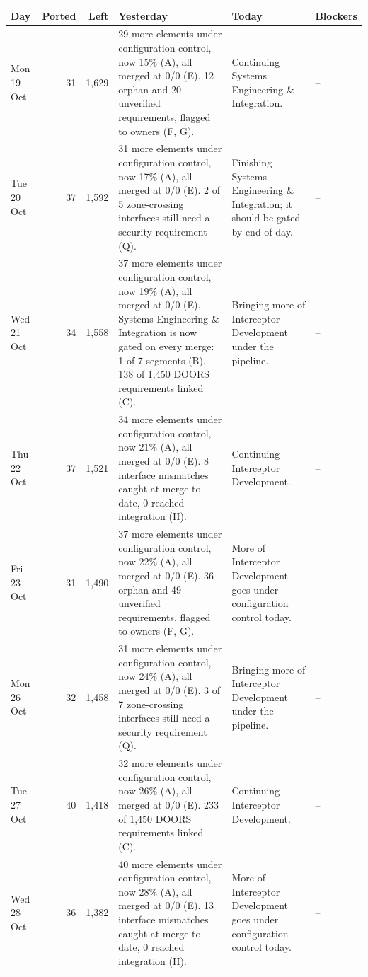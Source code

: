 \documentclass[12pt,letterpaper,oneside]{article}
\newcommand{\figfont}{\fontsize{9}{11}\selectfont}   %
\begin{document}
{\figfont\setlength{\tabcolsep}{4pt}\renewcommand{\arraystretch}{1.15}
\begin{longtable}{@{}>{\raggedright}p{} r r >{\raggedright}p{} >{\raggedright}p{} >{\raggedright\arraybackslash}p{}@{}}
\toprule
Day & Ported & Left & Yesterday & Today & Blockers \\
\midrule
\endhead
\bottomrule
\endfoot
Mon 19 Oct & 31 & 1,629 & 29 more elements under configuration control, now 15\% (A), all merged at 0/0 (E). 12 orphan and 20 unverified requirements, flagged to owners (F, G). & Continuing Systems Engineering \& Integration. & -- \\
Tue 20 Oct & 37 & 1,592 & 31 more elements under configuration control, now 17\% (A), all merged at 0/0 (E). 2 of 5 zone-crossing interfaces still need a security requirement (Q). & Finishing Systems Engineering \& Integration; it should be gated by end of day. & -- \\
Wed 21 Oct & 34 & 1,558 & 37 more elements under configuration control, now 19\% (A), all merged at 0/0 (E). Systems Engineering \& Integration is now gated on every merge: 1 of 7 segments (B). 138 of 1,450 DOORS requirements linked (C). & Bringing more of Interceptor Development under the pipeline. & -- \\
Thu 22 Oct & 37 & 1,521 & 34 more elements under configuration control, now 21\% (A), all merged at 0/0 (E). 8 interface mismatches caught at merge to date, 0 reached integration (H). & Continuing Interceptor Development. & -- \\
Fri 23 Oct & 31 & 1,490 & 37 more elements under configuration control, now 22\% (A), all merged at 0/0 (E). 36 orphan and 49 unverified requirements, flagged to owners (F, G). & More of Interceptor Development goes under configuration control today. & -- \\
Mon 26 Oct & 32 & 1,458 & 31 more elements under configuration control, now 24\% (A), all merged at 0/0 (E). 3 of 7 zone-crossing interfaces still need a security requirement (Q). & Bringing more of Interceptor Development under the pipeline. & -- \\
Tue 27 Oct & 40 & 1,418 & 32 more elements under configuration control, now 26\% (A), all merged at 0/0 (E). 233 of 1,450 DOORS requirements linked (C). & Continuing Interceptor Development. & -- \\
Wed 28 Oct & 36 & 1,382 & 40 more elements under configuration control, now 28\% (A), all merged at 0/0 (E). 13 interface mismatches caught at merge to date, 0 reached integration (H). & More of Interceptor Development goes under configuration control today. & -- \\

\end{longtable}}
\end{document}
